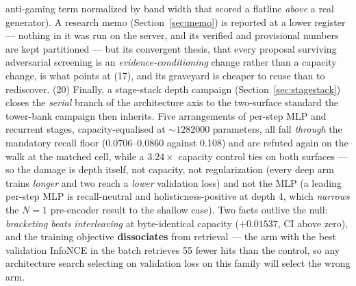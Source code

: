 \documentclass[11pt]{article}
\begin{document}
anti-gaming term normalized by band width that scored a flatline \emph{above} a
real generator). A research memo (Section~\ref{sec:memo}) is reported at a lower
register --- nothing in it was run on the server, and its verified and provisional
numbers are kept partitioned --- but its convergent thesis, that every proposal
surviving adversarial screening is an \emph{evidence-conditioning} change rather
than a capacity change, is what points at (17), and its graveyard is cheaper to
reuse than to rediscover.
(20) Finally, a stage-stack depth campaign (Section~\ref{sec:stagestack}) closes
the \emph{serial} branch of the architecture axis to the two-surface standard the
tower-bank campaign then inherits. Five arrangements of per-step MLP and recurrent
stages, capacity-equalised at ${\sim}\num{1282000}$ parameters, all fall
\emph{through} the mandatory recall floor (\numrange{0.0706}{0.0860} against
\num{0.108}) and are refuted again on the walk at the matched cell, while a
$\num{3.24}\times$ capacity control ties on both surfaces --- so the damage is depth
itself, not capacity, not regularization (every deep arm trains \emph{longer} and
two reach a \emph{lower} validation loss) and not the MLP (a leading per-step MLP
is recall-neutral and holisticness-positive at depth 4, which \emph{narrows} the
$N=1$ pre-encoder result to the shallow case). Two facts outlive the null:
\emph{bracketing beats interleaving} at byte-identical capacity
($+\num{0.01537}$, CI above zero), and the training objective \textbf{dissociates}
from retrieval --- the arm with the best validation InfoNCE in the batch retrieves
\num{55} fewer hits than the control, so any architecture search selecting on
validation loss on this family will select the wrong arm.
\end{document}
